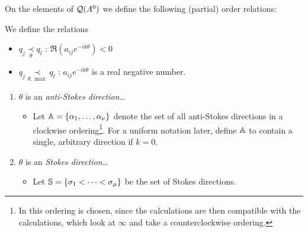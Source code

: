 On the elements of $\cQ(A^0)$ we define the following (partial) order
relations:
\begin{defn}
  We define the relations
  \begin{itemize}
    \item $q_j \underset{\theta}{\prec} q_l$
      :\Leftrightarrow{} $\Re(a_{ij}e^{-ik\theta})<0$
      \begin{comment}
        \Leftrightarrow{} $e^{(q_j-g_l)(t^{-1})}$ is flat at $0$ in a
        neighbourhood of the direction $\theta$.
        \TODO[define?]
      \end{comment}
    \item $q_j \underset{\theta,\max}{\prec} q_l$
      :\Leftrightarrow{} $a_{ij}e^{-ik\theta}$ is a real negative number.
      \begin{comment}
        \Leftrightarrow{} $q_{ij}(t^{-1})\in\R_{<0}$ along $\theta$.
      \end{comment}
      \begin{comment}
        \Leftrightarrow{} $e^{(q_j-g_l)(t^{-1})}$ is of maximal decay in the
        direction $\theta$.
        \TODO[define?]
      \end{comment}
  \end{itemize}
  \begin{comment}
    see \cite{Loday1994} Def I.4.4 for the definition in the ramified case,
    since
    \begin{itemize}
      \item In the unramified case these relations do not depend on the
        determination $\tilde\theta$ of $\theta$
    \end{itemize}
  \end{comment}
\end{defn}

\begin{defn}
  \begin{enumerate}
    \item $\theta$ is an \emph{anti-Stokes direction}\dots
      \begin{itemize}
        \item Let $\A=\{\alpha_1,\dots,\alpha_{\nu}\}$ denote the set of all
          anti-Stokes directions in a clockwise ordering\footnote{In
          \cite{Loday1994} this ordering is chosen, since the calculations are
          then compatible with the calculations, which look at $\infty$ and take
          a counterclockwise ordering.}. For a uniform
          notation later, define $\A$ to contain a single, arbitrary direction
          if $k=0$.
      \end{itemize}
    \item $\theta$ is an \emph{Stokes direction}\dots
      \begin{itemize}
        \item Let $\S=\{\sigma_1<\cdots<\sigma_\mu\}$ be the set of Stokes
          directions.
      \end{itemize}
  \end{enumerate}
\end{defn}

